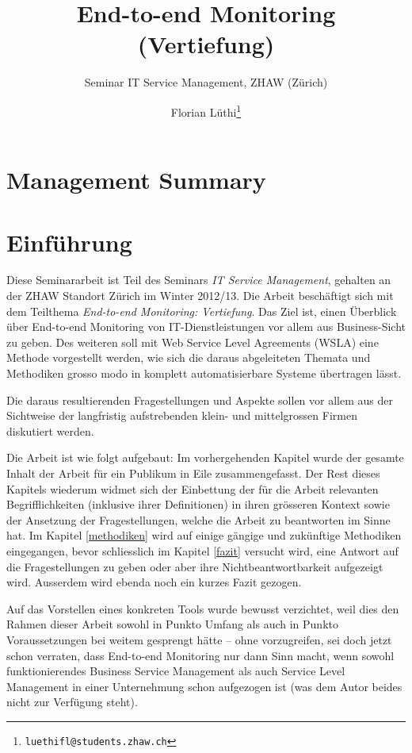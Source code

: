 \documentclass[11pt,listof=totoc]{scrreprt} %
\title{End-to-end Monitoring (Vertiefung)}
\subtitle{Seminar IT Service Management, ZHAW (Zürich)}
\author{Florian Lüthi\footnote{\tt luethifl@students.zhaw.ch}}
\theoremstyle{definition}
\begin{document}
\maketitle

\tableofcontents

\chapter{Management Summary}

\chapter{Einführung}

Diese Seminararbeit ist Teil des Seminars {\em IT Service Management}, gehalten an der ZHAW Standort Zürich im Winter 2012/13. Die Arbeit beschäftigt sich mit dem Teilthema {\em End-to-end Monitoring: Vertiefung}. Das Ziel  ist, einen Überblick über End-to-end Monitoring von IT-Dienstleistungen vor allem aus Business-Sicht zu geben. Des weiteren soll mit Web Service Level Agreements (WSLA) eine Methode vorgestellt werden, wie sich die daraus abgeleiteten Themata und Methodiken grosso modo in komplett automatisierbare Systeme übertragen lässt.

Die daraus resultierenden Fragestellungen und Aspekte sollen vor allem aus der Sichtweise der langfristig aufstrebenden klein- und mittelgrossen Firmen diskutiert werden.

Die Arbeit ist wie folgt aufgebaut: Im vorhergehenden Kapitel wurde der gesamte Inhalt der Arbeit für ein Publikum in Eile zusammengefasst. Der Rest dieses Kapitels wiederum widmet sich der Einbettung der für die Arbeit relevanten Begrifflichkeiten (inklusive ihrer Definitionen) in ihren grösseren Kontext sowie der Ansetzung der Fragestellungen, welche die Arbeit zu beantworten im Sinne hat. Im Kapitel \ref{methodiken} wird auf einige gängige und zukünftige Methodiken eingegangen, bevor schliesslich im Kapitel \ref{fazit} versucht wird, eine Antwort auf die Fragestellungen zu geben oder aber ihre Nichtbeantwortbarkeit aufgezeigt wird. Ausserdem wird ebenda noch ein kurzes Fazit gezogen.

Auf das Vorstellen eines konkreten Tools wurde bewusst verzichtet, weil dies den Rahmen dieser Arbeit sowohl in Punkto Umfang als auch in Punkto Voraussetzungen bei weitem gesprengt hätte -- ohne vorzugreifen, sei doch jetzt schon verraten, dass End-to-end Monitoring nur dann Sinn macht, wenn sowohl funktionierendes Business Service Management als auch Service Level Management in einer Unternehmung schon aufgezogen ist (was dem Autor beides nicht zur Verfügung steht).
\end{document}
